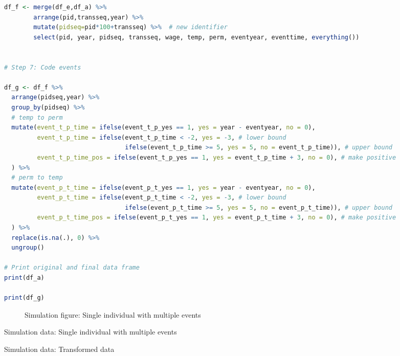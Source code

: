 \begin{lstlisting}[language=R]
df_f <- merge(df_e,df_a) %>%
        arrange(pid,transseq,year) %>%
        mutate(pidseq=pid*100+transseq) %>%  # new identifier
        select(pid, year, pidseq, transseq, wage, temp, perm, eventyear, eventtime, everything())


# Step 7: Code events

df_g <- df_f %>%
  arrange(pidseq,year) %>%
  group_by(pidseq) %>%
  # temp to perm
  mutate(event_t_p_time = ifelse(event_t_p_yes == 1, yes = year - eventyear, no = 0),
         event_t_p_time = ifelse(event_t_p_time < -2, yes = -3, # lower bound
                                 ifelse(event_t_p_time >= 5, yes = 5, no = event_t_p_time)), # upper bound
         event_t_p_time_pos = ifelse(event_t_p_yes == 1, yes = event_t_p_time + 3, no = 0), # make positive
  ) %>%
  # perm to temp
  mutate(event_p_t_time = ifelse(event_p_t_yes == 1, yes = year - eventyear, no = 0),
         event_p_t_time = ifelse(event_p_t_time < -2, yes = -3, # lower bound
                                 ifelse(event_p_t_time >= 5, yes = 5, no = event_p_t_time)), # upper bound
         event_p_t_time_pos = ifelse(event_p_t_yes == 1, yes = event_p_t_time + 3, no = 0), # make positive
  ) %>%
  replace(is.na(.), 0) %>% 
  ungroup()

# Print original and final data frame
print(df_a)

print(df_g)
\end{lstlisting}


\clearpage

\begin{sidewaysfigure}[!h]
    \caption{Simulation figure: Single individual with multiple events}
    \label{graph_compare_transformed_data}
\end{sidewaysfigure}


\begin{table}[!h]
\caption{Simulation data: Single individual with multiple events}
\centering
    
\label{table_compare_transformed_data_original}
\end{table}

\begin{table}[!h]
\caption{Simulation data: Transformed data}
\centering
    \resizebox{\textwidth}{!}{}
\label{table_compare_transformed_data_transformed}
\end{table}

